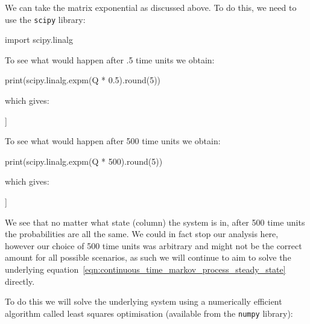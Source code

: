We can take the matrix exponential as
discussed above. To do this, we need to use the \texttt{scipy}
library:

\begin{pyin}
import scipy.linalg
\end{pyin}

To see what would happen after .5 time units we obtain:

\begin{pyin}
print(scipy.linalg.expm(Q * 0.5).round(5))
\end{pyin}

which gives:

\begin{pyout}
[[0.10492 0.21254 0.20377 0.17142 0.13021 0.09564 0.0815 ]
 [0.08501 0.18292 0.18666 0.1708  0.14377 0.1189  0.11194]
 [0.06521 0.14933 0.16338 0.16478 0.15633 0.14751 0.15346]
 [0.04388 0.10931 0.13183 0.15181 0.16777 0.18398 0.21142]
 [0.02667 0.07361 0.10005 0.13422 0.17393 0.2189  0.27262]
 [0.01567 0.0487  0.07552 0.11775 0.17512 0.24484 0.32239]
 [0.01068 0.03668 0.06286 0.10824 0.17448 0.25791 0.34914]]
\end{pyout}

To see what would happen after 500 time units we obtain:

\begin{pyin}
print(scipy.linalg.expm(Q * 500).round(5))
\end{pyin}

which gives:

\begin{pyout}
[[0.03431 0.08577 0.10722 0.13402 0.16752 0.2094  0.26176]
 [0.03431 0.08577 0.10722 0.13402 0.16752 0.2094  0.26176]
 [0.03431 0.08577 0.10722 0.13402 0.16752 0.2094  0.26176]
 [0.03431 0.08577 0.10722 0.13402 0.16752 0.2094  0.26176]
 [0.03431 0.08577 0.10722 0.13402 0.16752 0.2094  0.26176]
 [0.03431 0.08577 0.10722 0.13402 0.16752 0.2094  0.26176]
 [0.03431 0.08577 0.10722 0.13402 0.16752 0.2094  0.26176]]
\end{pyout}

We see that no matter what state (column) the system is in, after 500 time units
the probabilities are all the same. We could in fact stop our analysis here,
however our choice of 500 time units was arbitrary and might not be the correct
amount for all possible scenarios, as such we will continue to aim to solve the
underlying equation~\ref{eqn:continuous_time_markov_process_steady_state}
directly.

To do this we will solve the underlying system using a numerically efficient
algorithm called least squares optimisation (available from the
\texttt{numpy} library):

